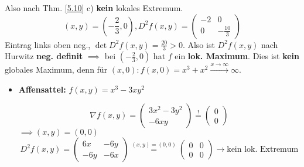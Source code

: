 \begin{example}
	Also nach Thm. \ref{5.10} c) \textbf{kein} lokales Extremum.
	\[
		(x, y) = \left( - \frac{ 2 }{ 3 } , 0 \right) , D^2 f\left( x, y \right) = \begin{pmatrix} -2 & 0 \\ 0 & - \frac{ 10 }{ 3 }  \end{pmatrix} 
	\]
	Eintrag links oben neg., $ \det D^2f(x, y) = \frac{ 20 }{ 3 } > 0 $. Also ist $ D^2 f(x, y) $ nach Hurwitz \textbf{neg. definit} $ \implies  $ bei $ \left( -\frac{ 2 }{ 3 } , 0 \right)  $ hat $ f $ ein \textbf{lok. Maximum}.
	Dies ist \textbf{kein} globales Maximum, denn für $ (x, 0): f(x, 0) = x^3 + x^2 \overset{x \to \infty}{\longrightarrow} \infty $.

	\begin{itemize}
		\item \textbf{Affensattel:} $ f(x, y) = x^3 - 3xy^2 $ 
			\[
				\nabla f(x, y) = \begin{pmatrix} 3x^2 - 3y^2 \\ -6xy \end{pmatrix} \overset{!}{=} \begin{pmatrix} 0 \\ 0 \end{pmatrix} 
			\]
			$ \implies (x, y) = (0, 0) $ 
			\[
				D^2 f(x, y) = \begin{pmatrix} 6x & -6y \\ -6y & -6x \end{pmatrix} \overset{(x, y) = (0, 0)}{=} \begin{pmatrix} 0 & 0 \\ 0 & 0 \end{pmatrix} \to \text{kein lok. Extremum} 
			\]
	\end{itemize}
	
\end{example}

